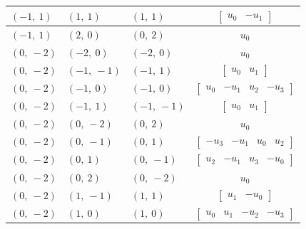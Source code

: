 \documentclass[11pt]{article}
\theoremstyle{definition}
\begin{document}
\begin{longtable}{|l|l|l|c|}
    \hline
    $\left( -1, \  1\right)$ & $\left( 1, \  1\right)$ & $\left( 1, \  1\right)$ & $\left[\begin{matrix}u_{0} & - u_{1}\end{matrix}\right]$ \\
    \hline
    $\left( -1, \  1\right)$ & $\left( 2, \  0\right)$ & $\left( 0, \  2\right)$ & $u_{0}$ \\
    \hline
    $\left( 0, \  -2\right)$ & $\left( -2, \  0\right)$ & $\left( -2, \  0\right)$ & $u_{0}$ \\
    \hline
    $\left( 0, \  -2\right)$ & $\left( -1, \  -1\right)$ & $\left( -1, \  1\right)$ & $\left[\begin{matrix}u_{0} & u_{1}\end{matrix}\right]$ \\
    \hline
    $\left( 0, \  -2\right)$ & $\left( -1, \  0\right)$ & $\left( -1, \  0\right)$ & $\left[\begin{matrix}u_{0} & - u_{1} & u_{2} & - u_{3}\end{matrix}\right]$ \\
    \hline
    $\left( 0, \  -2\right)$ & $\left( -1, \  1\right)$ & $\left( -1, \  -1\right)$ & $\left[\begin{matrix}u_{0} & u_{1}\end{matrix}\right]$ \\
    \hline
    $\left( 0, \  -2\right)$ & $\left( 0, \  -2\right)$ & $\left( 0, \  2\right)$ & $u_{0}$ \\
    \hline
    $\left( 0, \  -2\right)$ & $\left( 0, \  -1\right)$ & $\left( 0, \  1\right)$ & $\left[\begin{matrix}- u_{3} & - u_{1} & u_{0} & u_{2}\end{matrix}\right]$ \\
    \hline
    $\left( 0, \  -2\right)$ & $\left( 0, \  1\right)$ & $\left( 0, \  -1\right)$ & $\left[\begin{matrix}u_{2} & - u_{1} & u_{3} & - u_{0}\end{matrix}\right]$ \\
    \hline
    $\left( 0, \  -2\right)$ & $\left( 0, \  2\right)$ & $\left( 0, \  -2\right)$ & $u_{0}$ \\
    \hline
    $\left( 0, \  -2\right)$ & $\left( 1, \  -1\right)$ & $\left( 1, \  1\right)$ & $\left[\begin{matrix}u_{1} & - u_{0}\end{matrix}\right]$ \\
    \hline
    $\left( 0, \  -2\right)$ & $\left( 1, \  0\right)$ & $\left( 1, \  0\right)$ & $\left[\begin{matrix}u_{0} & u_{1} & - u_{2} & - u_{3}\end{matrix}\right]$ \\

\end{longtable}
\end{document}

